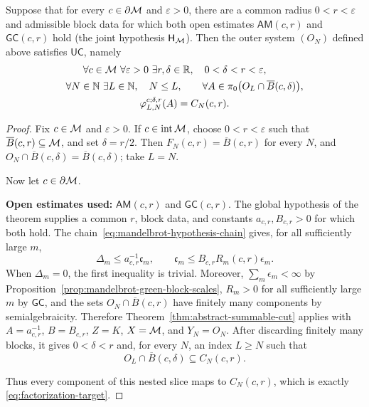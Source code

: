 \begin{theorem}
\label{thm:remaining-component-factorization}
Suppose that for every \(c\in\partial\mathcal M\) and \(\varepsilon>0\), there
are a common radius \(0<r<\varepsilon\) and admissible block data for
which both open estimates \(\mathsf{AM}(c,r)\) and \(\mathsf{GC}(c,r)\)
hold (the joint hypothesis \(\mathsf H_{\mathcal M}\)). Then the outer system
\((O_N)\) defined above satisfies \(\mathsf{UC}\), namely
\begin{equation}
 \begin{gathered}
 \forall c\in\mathcal M\ \forall\varepsilon>0\
 \exists r,\delta\in\mathbb R,\quad 0<\delta<r<\varepsilon,\qquad\\
 \forall N\in\mathbb N\ \exists L\in\mathbb N,\quad N\le L,\qquad
 \forall A\in\pi_0\bigl(O_L\cap\overline B(c,\delta)\bigr),\\
 \varphi_{L,N}^{c;\delta,r}(A)=C_N(c,r).
 \end{gathered}
 \label{eq:factorization-target}
\end{equation}
\end{theorem}
\begin{proof}
Fix \(c\in\mathcal M\) and \(\varepsilon>0\). If
\(c\in\operatorname{int}\mathcal M\), choose \(0<r<\varepsilon\) such that
\(\overline B(c,r)\subseteq\mathcal M\), and set \(\delta=r/2\). Then
\(F_N(c,r)=\overline B(c,r)\) for every \(N\), and
\(O_N\cap\overline B(c,\delta)=\overline B(c,\delta)\); take \(L=N\).

Now let \(c\in\partial\mathcal M\).
\begin{conditionalstep}
\noindent\textbf{Open estimates used:}
\(\mathsf{AM}(c,r)\) and \(\mathsf{GC}(c,r)\).
The global hypothesis of the theorem supplies a common \(r\), block
data, and constants \(a_{c,r},B_{c,r}>0\) for which both hold. The
chain~\eqref{eq:mandelbrot-hypothesis-chain} gives, for all sufficiently
large \(m\),
\[
 \Delta_m\le a_{c,r}^{-1}\mathfrak c_m,\qquad
 \mathfrak c_m\le B_{c,r}R_m(c,r)\epsilon_m.
\]
When \(\Delta_m=0\), the first inequality is trivial. Moreover,
\(\sum_m\epsilon_m<\infty\) by
Proposition~\ref{prop:mandelbrot-green-block-scales}, \(R_m>0\) for all
sufficiently large \(m\) by \(\mathsf{GC}\), and the sets
\(O_N\cap\overline B(c,r)\) have finitely many components by
semialgebraicity. Therefore Theorem~\ref{thm:abstract-summable-cut}
applies with \(A=a_{c,r}^{-1}\), \(B=B_{c,r}\), \(Z=K\), \(X=\mathcal M\), and
\(Y_N=O_N\). After discarding finitely many blocks, it gives
\(0<\delta<r\) and, for every \(N\), an index \(L\ge N\) such that
\[
 O_L\cap\overline B(c,\delta)\subseteq C_N(c,r).
\]
\end{conditionalstep}
Thus every component of this nested slice maps to \(C_N(c,r)\), which
is exactly \eqref{eq:factorization-target}.
\end{proof}

